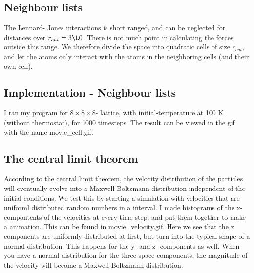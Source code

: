 \subsection{Neighbour lists}
The Lennard- Jones interactions is short ranged, and can be neglected for distances over $r_{cut} = 3\L0$. There is not much point in calculating the forces outside this range. We therefore divide the space into quadratic cells of size $r_{cut}$, and let the 
atoms only interact with the atoms in the neighboring cells (and their own cell).
\subsection{Implementation - Neighbour lists}
I ran my program for $8\times 8 \times 8$- lattice, with initial-temperature at 100 K (without thermostat), for 1000 timesteps. The result can be viewed in the gif with the name movie\_cell.gif.  

\subsection{The central limit theorem}
According to the central limit theorem, the velocity distribution of the particles will eventually evolve into a Maxwell-Boltzmann distribution independent of the initial conditions. We test this by starting a simulation with velocities that are uniforml distributed
random numbers in a interval. I made histograms of the x-compontents of the velocities at every time step, and put them together to make a animation. This can be found in movie\_velocity.gif. Here we see that the x components are uniformly distributed at first, but turn into the typical shape of a normal distribution. This happens for 
the y- and z- components as well. When you have a normal distribution for the three space components, the magnitude of the velocity will become a Maxwell-Boltzmann-distribution.  